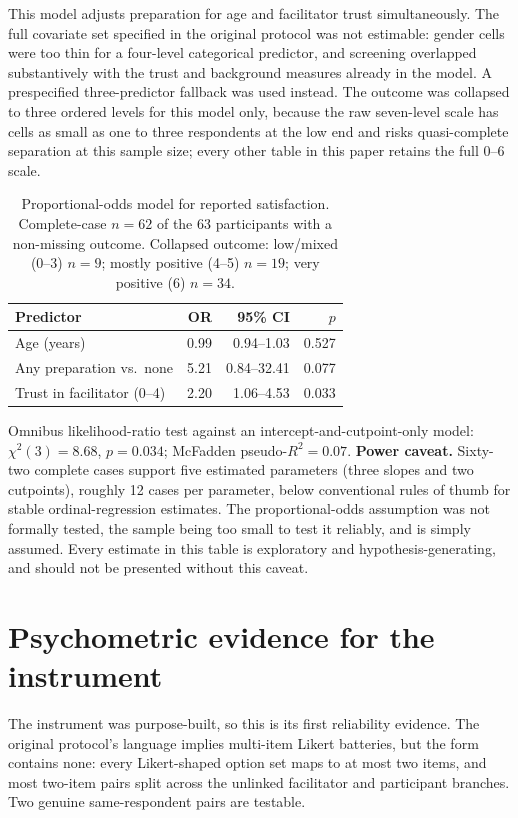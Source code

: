 \documentclass[12pt]{article}
\begin{document}
This model adjusts preparation for age and facilitator trust simultaneously. The full covariate set
specified in the original protocol was not estimable: gender cells were too thin for a four-level
categorical predictor, and screening overlapped substantively with the trust and background measures
already in the model. A prespecified three-predictor fallback was used instead. The outcome was collapsed
to three ordered levels for this model only, because the raw seven-level scale has cells as small as one to
three respondents at the low end and risks quasi-complete separation at this sample size; every other table
in this paper retains the full 0--6 scale.

\begin{table}[htbp]
\centering
\caption{Proportional-odds model for reported satisfaction. Complete-case $n=62$ of the 63 participants
with a non-missing outcome. Collapsed outcome: low/mixed (0--3) $n=9$; mostly positive (4--5) $n=19$; very
positive (6) $n=34$.}
\begin{tabular}{lrrr}
\toprule
Predictor & OR & 95\% CI & $p$ \\
\midrule
Age (years) & 0.99 & 0.94--1.03 & 0.527 \\
Any preparation vs.\ none & 5.21 & 0.84--32.41 & 0.077 \\
Trust in facilitator (0--4) & 2.20 & 1.06--4.53 & 0.033 \\
\bottomrule
\end{tabular}
\end{table}

\noindent
Omnibus likelihood-ratio test against an intercept-and-cutpoint-only model: $\chi^2(3)=8.68$, $p=0.034$;
McFadden pseudo-$R^2=0.07$. \textbf{Power caveat.} Sixty-two complete cases support five estimated
parameters (three slopes and two cutpoints), roughly 12 cases per parameter, below conventional rules of
thumb for stable ordinal-regression estimates. The proportional-odds assumption was not formally tested,
the sample being too small to test it reliably, and is simply assumed. Every estimate in this table is
exploratory and hypothesis-generating, and should not be presented without this caveat.

\section{Psychometric evidence for the instrument}

The instrument was purpose-built, so this is its first reliability evidence. The original protocol's
language implies multi-item Likert batteries, but the form contains none: every Likert-shaped option set
maps to at most two items, and most two-item pairs split across the unlinked facilitator and participant
branches. Two genuine same-respondent pairs are testable.
\end{document}
